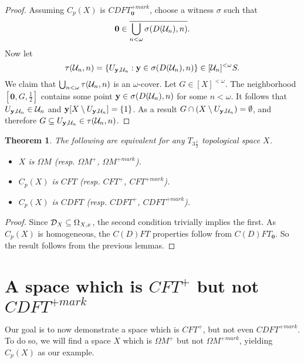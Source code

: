 \documentclass{amsart}
\renewcommand{\vec}{\mathbf}
\theoremstyle{plain}
\newtheorem{theorem}{Theorem}
\theoremstyle{definition}
\theoremstyle{remark}
\theoremstyle{plain}
\theoremstyle{definition}
\theoremstyle{remark}
\begin{document}
\begin{proof}
  Assuming \(C_p(X)\) is \(CDFT_{\vec 0}^{+mark}\), choose a witness
  \(\sigma\) such that
  \[
    \vec 0
      \in
    \cl{\bigcup_{n<\omega} \sigma(D(\mc U_n),n)}
  .\]
  Now let
  \[
    \tau(\mc U_n,n)
      =
    \{
      U_{\vec y,\mc U_n}
    :
      \vec y \in \sigma(D(\mc U_n),n)
    \}
      \in
    [\mc U_n]^{<\omega}S
  .\]
  We claim that \(\bigcup_{n<\omega}\tau(\mathcal{U}_n,n)\)
  is an \(\omega\)-cover.
  Let \(G\in[X]^{<\omega}\). The neighborhood \([\vec 0,G,\frac{1}{2}]\)
  contains some point \(\vec y\in \sigma(D(\mc U_n),n)\)
  for some \(n<\omega\). It follows
  that \(U_{\vec y,\mc U_n}\in\mc U_n\) and
  \(\vec y[X\setminus U_{\vec y,\mc U_n}]=\{1\}\). As a result
  \(G\cap(X\setminus U_{\vec y,\mc U_n})=\emptyset\), and therefore
  \(G\subseteq U_{\vec y,\mc U_n}\in\mc \tau(\mc U_n,n)\).
\end{proof}

\begin{theorem}\label{mengerFanTheorem}
  The following are equivalent for any \(T_{3\frac{1}{2}}\)
  topological space \(X\).
    \begin{itemize}
      \item \(X\) is \(\Omega M\)
            (resp. \(\Omega M^+\), \(\Omega M^{+mark}\)).
      \item \(C_p(X)\) is \(CFT\)
            (resp. \(CFT^+\), \(CFT^{+mark}\)).
      \item \(C_p(X)\) is \(CDFT\)
            (resp. \(CDFT^+\), \(CDFT^{+mark}\)).
    \end{itemize}
\end{theorem}

\begin{proof}
  Since \(\mathcal{D}_X\subseteq \Omega_{X,x}\), the second condition trivially
  implies the first. As \(C_p(X)\) is homogeneous, the \(C(D)FT\) properties
  follow from \(C(D)FT_{\vec 0}\). So the result follows from the
  previous lemmas.
\end{proof}



\section{A space which is \(CFT^+\) but not \(CDFT^{+mark}\)}

Our goal is to now demonstrate a space which is \(CFT^+\),
but not even \(CDFT^{+mark}\). To do so, we will find a space \(X\)
which is \(\Omega M^+\) but not \(\Omega M^{+mark}\), yielding \(C_p(X)\)
as our example.
\end{document}
